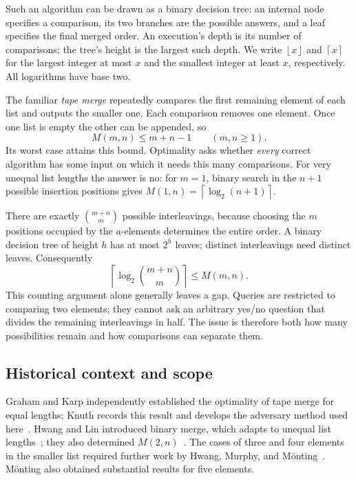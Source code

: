 \documentclass[11pt]{article}
\theoremstyle{definition}
\theoremstyle{remark}
\newcommand{\ceil}[1]{\left\lceil#1\right\rceil}
\newcommand{\floor}[1]{\left\lfloor#1\right\rfloor}
\begin{document}
Such an algorithm can be drawn as a binary decision tree: an internal
node specifies a comparison, its two branches are the possible answers,
and a leaf specifies the final merged order. An execution's depth is its
number of comparisons; the tree's height is the largest such depth.
We write $\floor{x}$ and $\ceil{x}$ for the largest integer at most $x$
and the smallest integer at least $x$, respectively. All logarithms have
base two.

The familiar \emph{tape merge} repeatedly compares the first remaining
element of each list and outputs the smaller one. Each comparison removes
one element. Once one list is empty the other can be appended, so
\begin{equation}\label{eq:tapeupper}
 M(m,n)\le m+n-1\qquad(m,n\ge1).
\end{equation}
Its worst case attains this bound. Optimality asks whether \emph{every}
correct algorithm has some input on which it needs this many comparisons.
For very unequal list lengths the answer is no: for $m=1$, binary search
in the $n+1$ possible insertion positions gives
$M(1,n)=\ceil{\log_2(n+1)}$.

There are exactly $\binom{m+n}{m}$ possible interleavings, because choosing
the $m$ positions occupied by the $a$-elements determines the entire order.
A binary decision tree of height $h$ has at most $2^h$ leaves; distinct
interleavings need distinct leaves. Consequently
\begin{equation}\label{eq:information}
 \ceil{\log_2\binom{m+n}{m}}\le M(m,n).
\end{equation}
This counting argument alone generally leaves a gap. Queries are restricted
to comparing two elements; they cannot ask an arbitrary yes/no question
that divides the remaining interleavings in half. The issue is therefore
both how many possibilities remain and how comparisons can separate them.

\subsection{Historical context and scope}
Graham and Karp independently established the optimality of tape merge for
equal lengths; Knuth records this result and develops the adversary method
used here~\cite[Section~5.3.2]{knuth}.
Hwang and Lin introduced binary merge, which adapts to unequal list
lengths~\cite{hwanglin1972}; they also determined $M(2,n)$~\cite{hwanglin1971}.
The cases of three and four elements in the smaller list required further
work by Hwang, Murphy, and M\"onting~\cite{hwang1980,murphy1978,monting1981}.
M\"onting also obtained substantial results for five elements.
\end{document}
